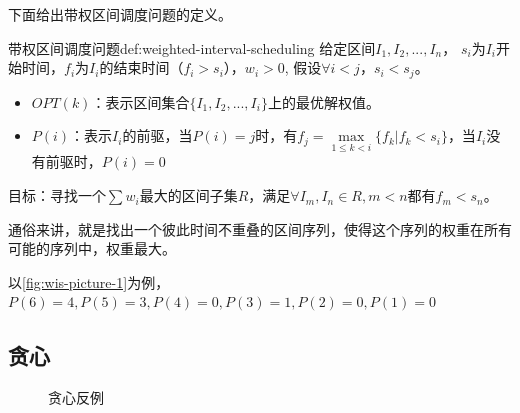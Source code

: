 下面给出带权区间调度问题的定义。

\begin{definition}{带权区间调度问题}{def:weighted-interval-scheduling}
  给定区间$I_1, I_2, ..., I_n$，
  $s_i$为$I_i$开始时间，$f_i$为$I_i$的结束时间（$f_i>s_i$），$w_i>0$, 假设$\forall i < j$，$ s_i<s_j$。
  \begin{itemize}
    \item $OPT(k)$：表示区间集合$\{ I_1, I_2, ... , I_i \}$上的最优解权值。
    \item $P(i)$：表示$I_i$的前驱，当$P(i)=j$时，有$f_j=\max\limits_{1 \leq k < i}\{f_k | f_k < s_i\}$，当$I_i$没有前驱时，$P(i)=0$
  \end{itemize}
  目标：寻找一个$\sum w_i$最大的区间子集$R$，满足$\forall I_m,I_n \in R, m < n \text{都有} f_m < s_n$。
\end{definition}

通俗来讲，就是找出一个彼此时间不重叠的区间序列，使得这个序列的权重在所有可能的序列中，权重最大。

\begin{remark}
  以\autoref{fig:wis-picture-1}为例，$P(6)=4, P(5)=3, P(4)=0, P(3)=1, P(2)=0, P(1)=0$
\end{remark}

\subsection{贪心}

\begin{figure}[hbt!]
  \centering
  \begin{subfigure}{.3\textwidth}
    \centering
    \caption{}
    \label{fig:wis-counterexample1}
  \end{subfigure}
  \begin{subfigure}{.3\textwidth}
    \centering
    \caption{}
    \label{fig:wis-counterexample2}
  \end{subfigure}
  \begin{subfigure}{.3\textwidth}
    \centering
    \caption{}
    \label{fig:wis-counterexample3}
  \end{subfigure}
  \caption{贪心反例}
  \label{fig:wis-counterexample}
\end{figure}

